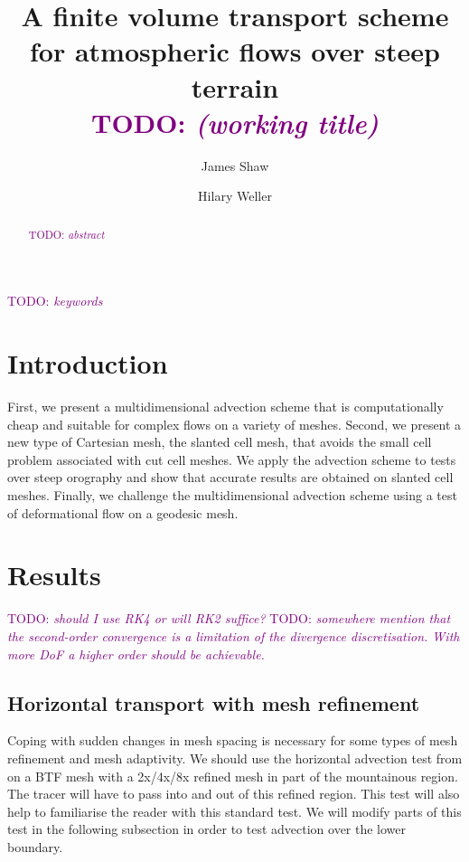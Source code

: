 \documentclass[times]{elsarticle}
\newcommand{\TODO}[1]{\textcolor{purple}{TODO: \emph{#1}}}
\begin{document}
\begin{frontmatter}
\title{A finite volume transport scheme for atmospheric flows over steep terrain \\ \TODO{(working title)}}
\author[uor]{James Shaw}
\author[uor]{Hilary Weller}

\address[uor]{Department of Meteorology, University of Reading, Reading, United Kingdom}

\begin{abstract}
	\TODO{abstract}
\end{abstract}

\begin{keyword}
	\TODO{keywords}
\end{keyword}
\end{frontmatter}

\section{Introduction}

First, we present a multidimensional advection scheme that is computationally cheap and suitable for complex flows on a variety of meshes.  Second, we present a new type of Cartesian mesh, the slanted cell mesh, that avoids the small cell problem associated with cut cell meshes.   We apply the advection scheme to tests over steep orography and show that accurate results are obtained on slanted cell meshes.  Finally, we challenge the multidimensional advection scheme using a test of deformational flow on a geodesic mesh.





\section{Results}
\TODO{should I use RK4 or will RK2 suffice?}
\TODO{somewhere mention that the second-order convergence is a limitation of the divergence discretisation.  With more DoF a higher order should be achievable.}

\subsection{Horizontal transport with mesh refinement}
Coping with sudden changes in mesh spacing is necessary for some types of mesh refinement and mesh adaptivity.  We should use the horizontal advection test from \citet{schaer2002} on a BTF mesh with a 2x/4x/8x refined mesh in part of the mountainous region.  The tracer will have to pass into and out of this refined region.  This test will also help to familiarise the reader with this standard test.  We will modify parts of this test in the following subsection in order to test advection over the lower boundary.
\end{document}
